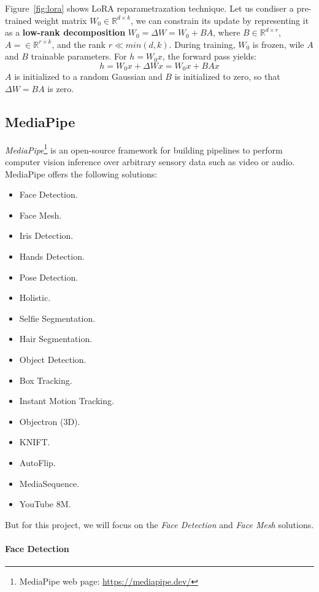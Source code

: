 \documentclass[preprint]{elsarticle}
\begin{document}
Figure~\ref{fig:lora} shows LoRA reparametrazation technique. Let us condiser a 
pre-trained weight matrix $W_0 \in \mathbb{R}^{d\times k}$, we can constrain its update
by representing it as a \textbf{low-rank decomposition} $W_0 = \Delta W=W_0+BA$, where $B \in \mathbb{R}^{d \times r}$,
$A= \in \mathbb{R}^{r \times k}$, and the rank $r \ll min(d,k)$.
During training, $W_0$ is frozen, wile $A$ and $B$ trainable parameters.
For $h = W_0x$, the forward pass yields:
\begin{equation}
	h = W_0x + \Delta Wx = W_0x + BAx
\end{equation}
$A$ is initialized to a random Gaussian and $B$ is initialized to zero, so that
$\Delta W = BA$ is zero.

\subsection{MediaPipe}
\emph{MediaPipe}\footnote{MediaPipe web page: \url{https://mediapipe.dev/}} 
is an open-source framework for building pipelines to perform computer vision 
inference over arbitrary sensory data such as video or audio.
MediaPipe offers the following solutions:
\begin{itemize}
	\item Face Detection.
	\item Face Mesh.
	\item Iris Detection.
	\item Hands Detection.
	\item Pose Detection.
	\item Holistic.
	\item Selfie Segmentation.
	\item Hair Segmentation.
	\item Object Detection.
	\item Box Tracking.
	\item Instant Motion Tracking.
	\item Objectron (3D).
	\item KNIFT.
	\item AutoFlip.
	\item MediaSequence.
	\item YouTube 8M.
\end{itemize}
But for this project, we will focus on the \emph{Face Detection} and \emph{Face Mesh} solutions.

\paragraph{Face Detection}
\end{document}
